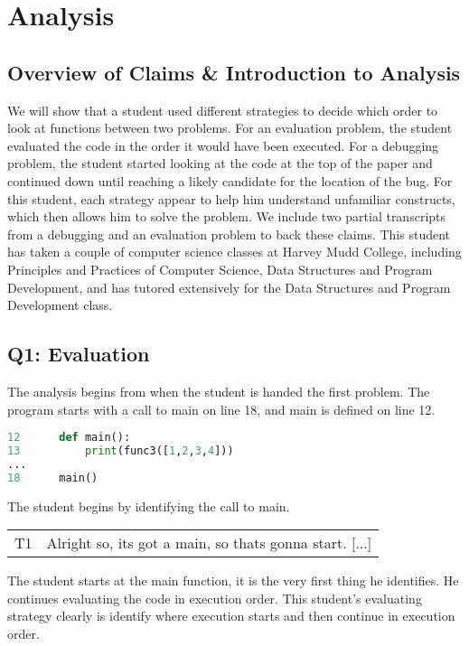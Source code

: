 \section{Analysis}
\subsection{Overview of Claims \& Introduction to Analysis}

We will show that a student used different strategies to decide which order to look at functions between two problems.
For an evaluation problem, the student evaluated the code in the order it would have been executed.
For a debugging problem, the student started looking at the code at the top of the paper and continued down until reaching a likely candidate for the location of the bug.
For this student, each strategy appear to help him understand unfamiliar constructs, which then allows him to solve the problem. 
We include two partial transcripts from a debugging and an evaluation problem to back these claims. 
This student has taken a couple of computer science classes at Harvey Mudd College, including Principles and Practices of Computer Science, Data Structures and Program Development, and has tutored extensively for the Data Structures and Program Development class.

\subsection{Q1: Evaluation}

The analysis begins from when the student is handed the first problem.
The program starts with a call to main on line 18, and main is defined on line 12.

\begin{lstlisting}[language=python]
12		def main():
13			print(func3([1,2,3,4]))
...
18		main()
\end{lstlisting}

The student begins by identifying the call to main.

\begin{tabular}{lp{13cm}}
T1&Alright so, its got a main, so thats gonna start. [...]\\
\end{tabular}

The student starts at the main function, it is the very first thing he identifies.
He continues evaluating the code in execution order.
This student's evaluating strategy clearly is identify where execution starts and then continue in execution order.

